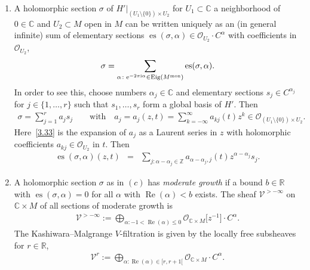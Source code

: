 \documentclass[10pt,a4paper]{amsart}
\numberwithin{equation}{section}
\numberwithin{figure}{section}
\newcommand{\Z}{{\mathbb Z}}
\newcommand{\C}{{\mathbb C}}
\newcommand{\R}{{\mathbb R}}
\newcommand{\OO}{{\mathcal O}}
\newcommand{\VV}{{\mathcal V}}
\DeclareMathOperator{\Eig}{Eig}
\DeclareMathOperator{\Ree}{Re}
\begin{document}
\begin{Definition}
\begin{enumerate}
\item[$(c)$] A holomorphic section $\sigma$
of $H'|_{(U_1\setminus\{0\})\times U_2}$ for $U_1\subset \C$
a neighborhood of $0\in\C$ and $U_2\subset M$ open in $M$
can be written uniquely as an (in general infinite) sum
of elementary sections
$\operatorname{es}(\sigma,\alpha)\in \OO_{U_2}\cdot C^\alpha$
with coefficients in $\OO_{U_2}$,
\begin{gather*}%
\sigma = \sum_{\alpha\colon {\rm e}^{-2\pi {\rm i}\alpha}\in\Eig(M^{\rm mon})}
\operatorname{es}(\sigma,\alpha).
\end{gather*}
In order to see this, choose numbers $\alpha_j\in\C$
and elementary sections $s_j\in C^{\alpha_j}$
for $j\in\{1,\dots ,r\}$ such that $s_1,\dots ,s_r$
form a global basis of $H'$. Then
\begin{gather}%
\sigma =\sum_{j=1}^r a_js_j \qquad\text{with}\quad
a_j=a_j(z,t)= \sum_{k=-\infty}^\infty a_{kj}(t)z^k\in
\OO_{(U_1\setminus\{0\})\times U_2}.\label{3.33}
\end{gather}
Here~\eqref{3.33} is the expansion of $a_j$ as a Laurent
series in $z$ with holomorphic coefficients
$a_{kj}\in \OO_{U_2}$ in $t$. Then
\begin{eqnarray*}%
\operatorname{es}(\sigma,\alpha)(z,t)&=& \sum_{j\colon \alpha-\alpha_j\in\Z}
a_{\alpha-\alpha_j,j}(t)z^{\alpha-\alpha_j}s_j.
\end{eqnarray*}

\item[$(d)$] A holomorphic section $\sigma$ as in $(c)$
has {\it moderate growth}
if a bound $b\in\R$ with $\operatorname{es}(\sigma,\alpha)=0$
for all $\alpha$ with $\Ree(\alpha)<b$ exists.
The sheaf $\VV^{>-\infty}$ on $\C\times M$
of all sections of moderate growth is
\begin{gather*}%
\VV^{>-\infty}:= \bigoplus_{\alpha\colon -1<\Ree(\alpha)\leq 0}
\OO_{\C\times M}\big[z^{-1}\big]\cdot C^\alpha.
\end{gather*}
The {Kashiwara--Malgrange $V$-filtration} is given by the
locally free subsheaves for $r\in\R$,
 \begin{gather*}%
\VV^{r}:= \bigoplus_{\alpha\colon \Ree(\alpha)\in[r,r+1[}
\OO_{\C\times M}\cdot C^\alpha.
\end{gather*}
\end{enumerate}

\end{Definition}
\end{document}

